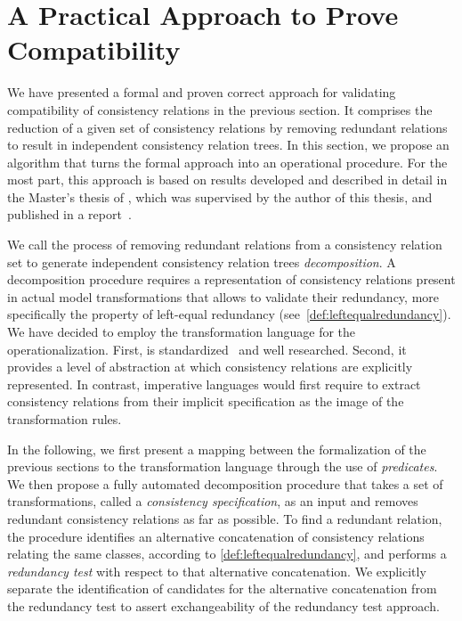 \section{A Practical Approach to Prove Compatibility}
\label{chap:compatibility:practical_approach}

We have presented a formal and proven correct approach for validating compatibility of consistency relations in the previous section.
It comprises the reduction of a given set of consistency relations by removing redundant relations to result in independent consistency relation trees.
In this section, we propose an algorithm that turns the formal approach into an operational procedure.
For the most part, this approach is based on results developed and described in detail in the Master's thesis of , which was supervised by the author of this thesis, and published in a report~.

We call the process of removing redundant relations from a consistency relation set to generate independent consistency relation trees \emph{decomposition}.
A decomposition procedure requires a representation of consistency relations present in actual model transformations that allows to validate their redundancy, more specifically the property of left-equal redundancy (see~\autoref{def:leftequalredundancy}).
We have decided to employ the transformation language \qvtr for the operationalization.
First, \qvtr is standardized~\cite{qvt} and well researched.
Second, it provides a level of abstraction at which consistency relations are explicitly represented.
In contrast, imperative languages would first require to extract consistency relations from their implicit specification as the image of the transformation rules.

In the following, we first present a mapping between the formalization of the previous sections to the \qvtr transformation language through the use of \emph{predicates}.
We then propose a fully automated decomposition procedure that takes a set of \qvtr transformations, called a \emph{consistency specification}, as an input and removes redundant consistency relations as far as possible.
To find a redundant relation, the procedure identifies an alternative concatenation of consistency relations relating the same classes, according to \autoref{def:leftequalredundancy}, and performs a \emph{redundancy test} with respect to that alternative concatenation.
We explicitly separate the identification of candidates for the alternative concatenation from the redundancy test to assert exchangeability of the redundancy test approach.


